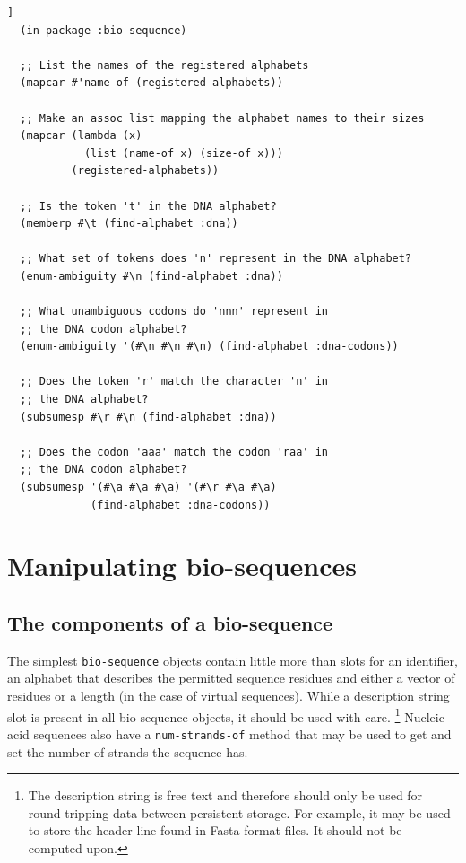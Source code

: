 \documentclass[a4paper, 12pt]{article}
\begin{document}
\begin{lstlisting}[caption={Using bio-sequence alphabets},
  label=lst:using-bioseq-alphabets,float=[tbph]]
  (in-package :bio-sequence)
  
  ;; List the names of the registered alphabets
  (mapcar #'name-of (registered-alphabets))

  ;; Make an assoc list mapping the alphabet names to their sizes
  (mapcar (lambda (x)
            (list (name-of x) (size-of x)))
          (registered-alphabets))

  ;; Is the token 't' in the DNA alphabet?
  (memberp #\t (find-alphabet :dna))

  ;; What set of tokens does 'n' represent in the DNA alphabet?
  (enum-ambiguity #\n (find-alphabet :dna))

  ;; What unambiguous codons do 'nnn' represent in
  ;; the DNA codon alphabet?
  (enum-ambiguity '(#\n #\n #\n) (find-alphabet :dna-codons))

  ;; Does the token 'r' match the character 'n' in
  ;; the DNA alphabet?
  (subsumesp #\r #\n (find-alphabet :dna))

  ;; Does the codon 'aaa' match the codon 'raa' in
  ;; the DNA codon alphabet?
  (subsumesp '(#\a #\a #\a) '(#\r #\a #\a)
             (find-alphabet :dna-codons))
\end{lstlisting}


\section{Manipulating bio-sequences}
\label{sec:manipulating-bioseq}

\subsection{The components of a bio-sequence}
\label{sec:components-of-bioseq}

The simplest \lstinline!bio-sequence! objects contain little more than
slots for an identifier, an alphabet that describes the permitted
sequence residues and either a vector of residues or a length (in the
case of virtual sequences). While a description string slot is present
in all bio-sequence objects, it should be used with
care. \footnote{The description string is free text and therefore
  should only be used for round-tripping data between persistent
  storage. For example, it may be used to store the header line found
  in Fasta format files. It should not be computed upon.}  Nucleic
acid sequences also have a \lstinline!num-strands-of! method that may
be used to get and set the number of strands the sequence has.
\end{document}
